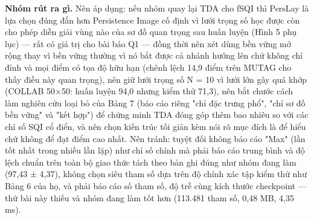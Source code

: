 \documentclass[12pt,a4paper]{article}
\begin{document}
\noindent \textbf{\color{tdtblue}Nhóm rút ra gì.} Nên áp dụng: nếu nhóm quay lại TDA cho fSQI thì PersLay là lựa chọn đúng đắn hơn Persistence Image cố định vì lưới trọng số học được còn cho phép diễn giải vùng nào của sơ đồ quan trọng sau huấn luyện (Hình 5 phụ lục) — rất có giá trị cho bài báo Q1 — đồng thời nên xét dùng bền vững mở rộng thay vì bền vững thường vì nó bắt được cả nhánh hướng lên chứ không chỉ đỉnh và mọi điểm có tọa độ hữu hạn (chênh lệch 14,9 điểm trên MUTAG cho thấy điều này quan trọng), nên giữ lưới trọng số N = 10 vì lưới lớn gây quá khớp (COLLAB 50×50: huấn luyện 94,0 nhưng kiểm thử 71,3), nên bắt chước cách làm nghiên cứu loại bỏ của Bảng 7 (báo cáo riêng "chỉ đặc trưng phổ", "chỉ sơ đồ bền vững" và "kết hợp") để chứng minh TDA đóng góp thêm bao nhiêu so với các chỉ số SQI cổ điển, và nên chọn kiến trúc tối giản kèm nói rõ mục đích là để hiểu chứ không để đạt điểm cao nhất. Nên tránh: tuyệt đối không báo cáo "Max" (lần tốt nhất trong nhiều lần lặp) như chỉ số chính mà phải báo cáo trung bình và độ lệch chuẩn trên toàn bộ giao thức tách theo bản ghi đúng như nhóm đang làm (97,43 ± 4,37), không chọn siêu tham số dựa trên độ chính xác tập kiểm thử như Bảng 6 của họ, và phải báo cáo số tham số, độ trễ cùng kích thước checkpoint — thứ bài này thiếu và nhóm đang làm tốt hơn (113.481 tham số, 0,48 MB, 4,35 ms).\par\vspace{3pt}
\vspace{6pt}
\end{document}
